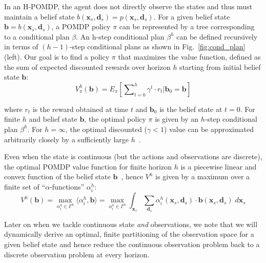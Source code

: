 \documentclass{article} %
\renewcommand{\vec}[1]{\mathbf{#1}} %
\newcommand{\xds}{\mathbf{x}_s,\!\mathbf{d}_s}
\renewcommand{\l}{\langle}
\renewcommand{\r}{\rangle}
\begin{document}
\label{sec:vi}

In an H-POMDP, the agent does not directly observe the states and thus
must maintain a belief state $b(\xds) = p(\xds)$.  For a
given belief state $\vec{b} = b(\xds)$, a POMDP policy $\pi$ can be
represented by a tree corresponding to a conditional plan $\beta$.  An
h-step conditional plan $\beta^h$ can be defined recursively in terms
of $(h-1)$-step conditional plans as shown in
Fig.~\ref{fig:cond_plan} (left).
Our goal is to find a policy $\pi$ that maximizes the value function,
defined as the sum of expected discounted rewards over horizon $h$
starting from initial belief state $\vec{b}$:
{\footnotesize
\vspace{-1mm}
\begin{equation}
V^h_\pi(\vec{b}) = E_{\pi} \left[ \sum\nolimits_{t=0}^{h} \gamma^t \cdot r_t \Big| \vec{b}_0 = \vec{b} \right]
\end{equation}
\vspace{-4mm}
}

where $r_t$ is the reward obtained at time $t$ and $\vec{b}_0$ is the
belief state at $t=0$.  For finite $h$ and belief state $\vec{b}$, the
optimal policy $\pi$ is given by an $h$-step conditional plan
$\beta^h$.  For $h = \infty$, the optimal discounted ($\gamma < 1$)
value can be approximated arbitrarily closely by 
a sufficiently large $h$~\cite{kaebling}.  

Even when the state is continuous (but the actions and observations
are discrete), 
the optimal POMDP value function for finite horizon $h$ is a piecewise linear and
convex function of the belief state $\vec{b}$~\cite{Perseus_cont}, hence 
$V^h$ is given by a maximum over a finite set of
``$\alpha$-functions'' $\alpha^h_i$:
{\footnotesize 
\vspace{-1mm}
\begin{equation}
V^h(\vec{b}) = \max_{\alpha^h_i \in \Gamma^h} \l \alpha^h_i, \vec{b} \r = \max_{\alpha^h_i \in \Gamma^h} \int_{\vec{x}_s} \sum_{\vec{d}_s} \alpha^h_i(\xds) \cdot \vec{b}(\xds) \; d\vec{x}_s 
\end{equation}
\vspace{-4mm}
}

Later on when we tackle continuous state \emph{and} observations,
we note that we will dynamically derive an optimal, 
finite partitioning of the observation
space for a given belief state and hence reduce the continuous
observation problem back to a discrete observation problem at every
horizon.  
\end{document}
